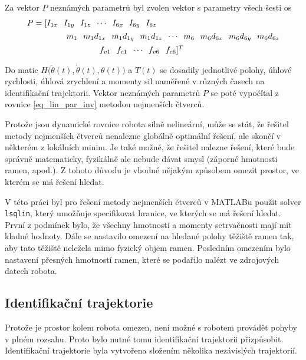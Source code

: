 Za vektor $P$ neznámých parametrů byl zvolen vektor s parametry všech šesti os
\[\addtolength{\arraycolsep}{-1.5pt}
\begin{split}
P &= 
[\begin{matrix} I_{1x} & I_{1y} & I_{1z} &\cdots &I_{6x} & I_{6y} & I_{6z} \end{matrix} \\
 &\qquad\qquad \begin{matrix}  m_1 & m_1d_{1x} & m_1d_{1y} & m_1d_{1z} &\cdots & m_6 & m_6d_{6x} & m_6d_{6y} & m_6d_{6z} \end{matrix} \\
 &\qquad\qquad\qquad\qquad \begin{matrix} f_{v1} & f_{c1} &\cdots & f_{v6} & f_{c6} \end{matrix}]^{T}
\end{split}
\]

Do matic $H\big(\ddot{\theta}(t),\dot{\theta}(t),\theta(t)\big)$ a $T(t)$ se dosadily jednotlivé polohy, úhlové rychlosti, úhlová zrychlení a momenty sil naměřené v různých časech na identifikační trajektorii. Vektor neznámých parametrů $P$ se poté vypočítal z rovnice \ref{eq_lin_par_inv} metodou nejmenších čtverců. 

Protože jsou dynamické rovnice robota silně nelineární, může se stát, že řešitel metody nejmenších čtverců nenalezne globálně optimální řešení, ale skončí v některém z lokálních minim. Je také možné, že řešitel nalezne řešení, které bude správně matematicky, fyzikálně ale nebude dávat smysl (záporné hmotnosti ramen, apod.). Z tohoto důvodu je vhodné nějakým způsobem omezit prostor, ve kterém se má řešení hledat.

V této práci byl pro řešení metody nejmenších čtverců v MATLABu použit solver \texttt{lsqlin}, který umožňuje specifikovat hranice, ve kterých se má řešení hledat. První z podmínek bylo, že všechny hmotnosti a momenty setrvačnosti mají mít kladné hodnoty. Dále se nastavilo omezení na hledané polohy těžiště ramen tak, aby tato těžiště neležela mimo fyzický objem ramen. Posledním omezením bylo nastavení přesných hmotností ramen, které se podařilo nalézt ve zdrojových datech robota.

\label{postup_identifikace_ch}

\subsection{Identifikační trajektorie}

Protože je prostor kolem robota omezen, není možné s robotem provádět pohyby v plném rozsahu. Proto bylo nutné tomu identifikační trajektorii přizpůsobit. Identifikační trajektorie byla vytvořena složením několika nezávislých trajektorií. 

